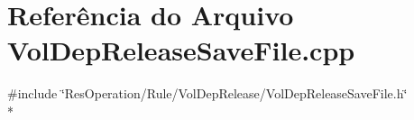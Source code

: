 \section{Referência do Arquivo Vol\+Dep\+Release\+Save\+File.\+cpp}
\label{_2_rule_2_vol_dep_release_2_vol_dep_release_save_file_8cpp}
{\ttfamily \#include \char`\"{}Res\+Operation/\+Rule/\+Vol\+Dep\+Release/\+Vol\+Dep\+Release\+Save\+File.\+h\char`\"{}}\\*
